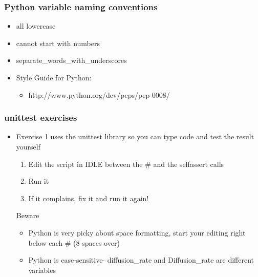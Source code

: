 \documentclass{beamer}
\begin{document}
\begin{frame}[fragile]
\frametitle{Python variable naming conventions}
\begin{itemize}
\item all lowercase
\item cannot start with numbers
\item separate\_words\_with\_underscores
\item Style Guide for Python: 
\begin{itemize}
\item http://www.python.org/dev/peps/pep-0008/
\end{itemize}
\end{itemize}
\end{frame}

\begin{frame}[fragile]
\frametitle{unittest exercises}
\begin{itemize}
\item Exercise 1 uses the unittest library so you can type code and test the result yourself  
\begin{enumerate}
  \item Edit the script in IDLE between the \# and the selfassert calls
  \item Run it 
  \item If it complains, fix it and run it again!
\end{enumerate}
\begin{alertblock}{Beware}
\begin{itemize}
\item Python is very picky about space formatting, start your editing right below each \# (8 spaces over)
\item Python is case-sensitive- diffusion\_rate and Diffusion\_rate are different variables
\end{itemize}
\end{alertblock}
\end{itemize}
\end{frame}
\end{document}
